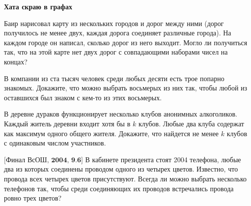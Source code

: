 \centerline{\bf \Huge Хата скраю в графах}
\centerline{\bf \Huge }

\begin{flushright}
        \scriptsize{}
\end{flushright}

Баир нарисовал карту из нескольких городов и дорог между ними (дорог получилось не менее двух, каждая дорога соединяет различные города). На каждом городе он написал, сколько дорог из него выходит. Могло ли получиться так, что на этой карте нет двух дорог с совпадающими наборами чисел на концах?

В компании из ста тысяч человек среди любых десяти есть трое попарно знакомых. Докажите, что можно выбрать восьмерых из них так, чтобы любой из оставшихся был знаком с кем-то из этих восьмерых.

В деревне дураков функционирует несколько клубов анонимных алкоголиков. Каждый житель деревни входит хотя бы в $k$ клубов. Любые два клуба содержат как максимум одного общего жителя. Докажите, что найдется не менее $k$ клубов с одинаковым числом участников.

$\bigl[\textbf{Финал ВсОШ, 2004, 9.6}\bigr]$
В кабинете президента стоят 2004   телефона, любые два из которых соединены проводом одного из четырех цветов. Известно, что провода всех четырех цветов присутствуют. Всегда ли можно выбрать несколько телефонов так, чтобы среди соединяющих их проводов встречались провода ровно трех цветов?